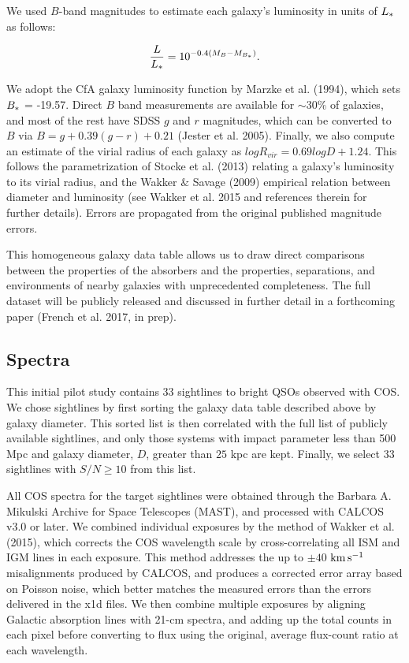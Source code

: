 \documentclass[twocolumn,tighten]{aastex6}
\begin{document}
We used $B$-band magnitudes to estimate each galaxy's luminosity in units of $L_{\**}$ as follows:

\begin{equation}
	\frac{L}{L_{\**}} = 10^{-0.4 (M_{B} - M_{B_{\**}})}.
\end{equation}

We adopt the CfA galaxy luminosity function by Marzke et al. (1994), which sets $B_{\**} $ = -19.57. Direct $B$ band measurements are available for $\sim 30\%$ of galaxies, and most of the rest have SDSS $g$ and $r$ magnitudes, which can be converted to $B$ via $B = g + 0.39 (g-r) + 0.21$ (Jester et al. 2005). Finally, we also compute an estimate of the virial radius of each galaxy as $log R_{vir} = 0.69 log D + 1.24$. This follows the parametrization of Stocke et al. (2013) relating a galaxy's luminosity to its virial radius, and the Wakker $\&$ Savage (2009) empirical relation between diameter and luminosity (see Wakker et al. 2015 and references therein for further details). Errors are propagated from the original published magnitude errors.

This homogeneous galaxy data table allows us to draw direct comparisons between the properties of the absorbers and the properties, separations, and environments of nearby galaxies with unprecedented completeness. The full dataset will be publicly released and discussed in further detail in a forthcoming paper (French et al. 2017, in prep).


\subsection{Spectra}

This initial pilot study contains 33 sightlines to bright QSOs observed with COS. We chose sightlines by first sorting the galaxy data table described above by galaxy diameter. This sorted list is then correlated with the full list of publicly available sightlines, and only those systems with impact parameter less than 500 Mpc and galaxy diameter, $D$, greater than $25$ kpc  are kept. Finally, we select 33 sightlines with $S/N \geq 10$ from this list.

All COS spectra for the target sightlines were obtained through the Barbara A. Mikulski Archive for Space Telescopes (MAST), and processed with CALCOS v3.0 or later. We combined individual exposures by the method of Wakker et al. (2015), which corrects the COS wavelength scale by cross-correlating all ISM and IGM lines in each exposure. This method addresses the up to $\pm40$ $\rm km\, s^{-1}$ misalignments produced by CALCOS, and produces a corrected error array based on Poisson noise, which better matches the measured errors than the errors delivered in the x1d files. We then combine multiple exposures by aligning Galactic absorption lines with 21-cm spectra, and adding up the total counts in each pixel before converting to flux using the original, average flux-count ratio at each wavelength.
\end{document}

